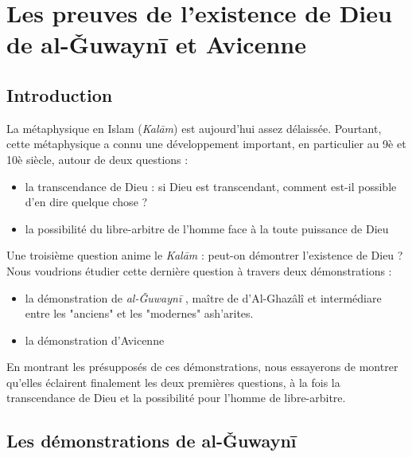 \chapter{Les preuves de l'existence de Dieu de al-Ǧuwaynī et Avicenne}

 

\section{Introduction}

La métaphysique en Islam (\emph{Kalām}) est aujourd'hui assez délaissée. Pourtant, cette métaphysique a connu une développement important, en particulier au 9è et 10è siècle, autour de deux questions : 
\begin{itemize}
    \item la transcendance de Dieu : si Dieu est transcendant, comment est-il possible d'en dire quelque chose ?
    \item la possibilité du libre-arbitre de l'homme face à la toute puissance de Dieu
\end{itemize}
Une troisième question anime le \emph{Kalām} : peut-on démontrer l'existence de Dieu ?  Nous voudrions étudier cette dernière question à travers deux démonstrations : 
\begin{itemize}
    \item la démonstration de \emph{al-Ǧuwaynī} , maître de d'Al-Ghazâlî et intermédiare entre les "anciens" et les "modernes" ash'arites.
    \item la démonstration d'Avicenne 
\end{itemize}
En montrant les présupposés de ces démonstrations, nous essayerons de montrer qu'elles éclairent finalement les deux premières questions, à la fois la transcendance de Dieu et la possibilité pour l'homme de libre-arbitre.


 

 
\section{Les démonstrations de al-Ǧuwaynī}



